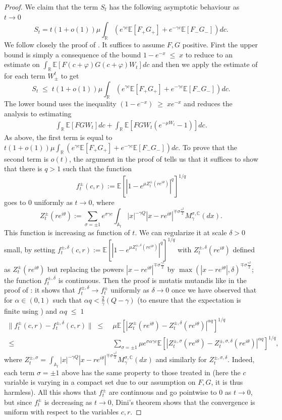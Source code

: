 \documentclass[11pt]{amsart}
\numberwithin{equation}{section}
\theoremstyle{definition}
\renewcommand{\leq}{\;\leqslant\;}                   %
\renewcommand{\geq}{\;\geqslant\;}                   %
\newcommand{\C}{\mathbb{C}}
\newcommand{\A}{\mathbb{A}}
\newcommand{\R}{\mathbb{R}}
\def\E{\mathbb{E}}
\begin{document}
\begin{proof}
We claim that the term $S_t$ has the following asymptotic behaviour as $t\to 0$
\[ S_t=t(1+o(1))\mu \int_{\R}( e^{\gamma c}\E[F_+G_+]+e^{-\gamma c}\E[F_-G_-])dc.\] 
We follow closely the proof of \cite[Lemma 5.4]{GKRV}. It suffices to assume $F,G$ positive. 
First the upper bound is simply a consequence of the bound $1-e^{-x}\leq x$ to reduce to an estimate on $\int_{\R} \E[ F(c+\varphi)G(c+\varphi)W_t]dc$
and then we apply the  estimate of \cite[Lemma 5.4]{GKRV} for each term $W_\pm^t$ to get 
\[ S_t\leq t(1+o(1))\mu \int_{\R}( e^{\gamma c}\E[F_+G_+]+e^{-\gamma c}\E[F_-G_-])dc.\] 
The lower bound uses the inequality $(1-e^{-x})\geq xe^{-x}$ and reduces the analysis to estimating 
\begin{align*}
\int_{\R} \E[ FG W_t]dc+\int_{\R} \E[ FGW_t(e^{-\mu W_t}-1)]dc.
\end{align*}
As above, the first term is equal to $t(1+o(1))\mu \int_{\R}( e^{\gamma c}\E[F_+G_+]+e^{-\gamma c}\E[F_-G_-])dc$.
To prove that the second term is $o(t)$, the argument in the proof of \cite[Lemma 5.4]{GKRV} tells us that it suffices to show that there is $q>1$
such that the function 
\[f^\pm_t(c,r):=\E[ |1-e^{\mu Z^\pm_t(re^{i\theta})}|^q]^{1/q}\]
goes to $0$ uniformly as $t\to 0$, where 
\[Z^\pm_t(re^{i\theta}):=\sum_{\sigma=\pm 1}
e^{\sigma\gamma c}\int_{\A_t}|x|^{-\gamma Q}|x-re^{i\theta}|^{\mp \sigma \frac{\gamma^2}{2}}M^{\sigma,\C}_\gamma(dx).\] 
This function is increasing as function of $t$.
We can regularize it at scale $\delta>0$ small, by setting $f^{\pm,\delta}_t(c,r):=\E[ |1-e^{\mu Z^{\pm,\delta}_t(re^{i\theta})}|^q]^{1/q}$
with $Z^{\pm,\delta}_t(re^{i\theta})$ defined as $Z^{\pm}_t(re^{i\theta})$ but replacing the powers $|x-re^{i\theta}|^{\mp\sigma \frac{\gamma^2}{2}}$ by
 $\max(|x-re^{i\theta}|,\delta)^{\mp\sigma \frac{\gamma^2}{2}}$; the function $f^{\pm,\delta}_t$ is continuous. Then the proof is mutatis mutandis like in the 
 proof of \cite[Lemma 5.4]{GKRV}: it shows that $f^{\pm,\delta}_t\to f^{\pm}_t$ uniformly as $\delta\to 0$
  once we have observed that for $\alpha\in (0,1)$ such that $\alpha q<\frac{2}{\gamma}(Q-\gamma)$ (to ensure that the expectation is finite using \cite[Lemma 3.10]{DKRV16}) and $\alpha q\leq 1$
 \[\begin{split} 
 \| f^\pm_{t}(c,r)- f^{\pm,\delta}_{t}(c,r)\|\leq & \mu \E[ |Z^\pm_t(re^{i\theta})-Z^{\pm,\delta}_t(re^{i\theta})|^{\alpha q}]^{1/q}\\
\leq &  \sum_{\sigma=\pm 1}\mu e^{\sigma \alpha \gamma c}\E[ |Z^{\pm,\sigma}_t(re^{i\theta})-Z^{\pm,\sigma,\delta}_t(re^{i\theta})|^{\alpha q}]^{1/q},
 \end{split}\]
 where $Z^{\pm,\sigma}_t=\int_{\A_t}|x|^{-\gamma Q}|x-re^{i\theta}|^{\mp \sigma \frac{\gamma^2}{2}}M^{\sigma,\C}_\gamma(dx)$ and similarly for $Z^{\pm,\sigma,\delta}_t$. Indeed, each term $\sigma=\pm 1$ above has the same property to those treated in  \cite[Lemma 5.4]{GKRV} (here the $c$ variable is varying in a compact set due to our assumption on $F,G$, it is thus harmless). All this shows that $f_t^\pm$ are continuous and go pointwise to $0$ as $t\to 0$, but since $f_t^\pm$ is decreasing as $t\to 0$, Dini's theorem shows that the convergence is uniform with respect to the variables $c,r$.


\end{proof}
\end{document}
